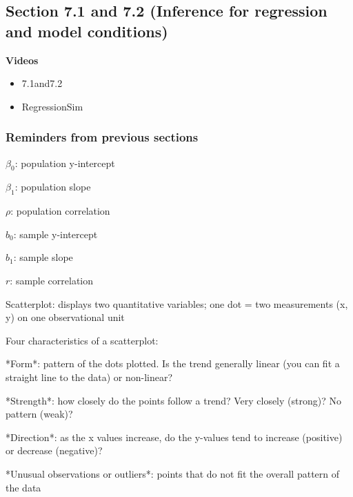 \documentclass[
]{report}
\providecommand{\tightlist}{%
  \setlength{\itemsep}{0pt}\setlength{\parskip}{0pt}}
\newcommand{\rgi}{\hspace{24pt}}  %
\begin{document}
\hypertarget{section-7.1-and-7.2-inference-for-regression-and-model-conditions}{%
\subsection*{Section 7.1 and 7.2 (Inference for regression and model conditions)}\label{section-7.1-and-7.2-inference-for-regression-and-model-conditions}}

\textbf{Videos}

\begin{itemize}
\tightlist
\item
  7.1and7.2
\item
  RegressionSim
\end{itemize}


\hypertarget{reminders-from-previous-sections-9}{%
\subsubsection*{Reminders from previous sections}\label{reminders-from-previous-sections-9}}

\(\beta_0\): population y-intercept

\(\beta_1\): population slope

\(\rho\): population correlation

\(b_0\): sample y-intercept

\(b_1\): sample slope

\(r\): sample correlation

Scatterplot: displays two quantitative variables; one dot = two measurements (x, y) on one observational unit

Four characteristics of a scatterplot:

\rgi *Form*: pattern of the dots plotted. Is the trend generally linear (you can fit a straight line to the data) or non-linear?

\rgi *Strength*: how closely do the points follow a trend? Very closely (strong)? No pattern (weak)?

\rgi *Direction*: as the x values increase, do the y-values tend to increase (positive) or decrease (negative)?

\rgi *Unusual observations or outliers*: points that do not fit the overall pattern of the data
\end{document}
